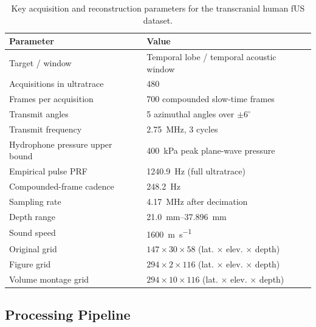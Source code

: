 \documentclass[11pt]{article}
\begin{document}
\begin{table}[t]
\centering
\caption{Key acquisition and reconstruction parameters for the
  transcranial human fUS dataset.}
\label{tab:invivo_params}
\small
\begin{tabular}{@{}ll@{}}
\toprule
Parameter & Value \\
\midrule
Target / window & Temporal lobe / temporal acoustic window \\
Acquisitions in ultratrace & 480 \\
Frames per acquisition & 700 compounded slow-time frames \\
Transmit angles & 5 azimuthal angles over $\pm 6^\circ$ \\
Transmit frequency & \SI{2.75}{\mega\hertz}, 3 cycles \\
Hydrophone pressure upper bound & \SI{400}{\kilo\pascal} peak plane-wave pressure \\
Empirical pulse PRF & \SI{1240.9}{\hertz} (full ultratrace) \\
Compounded-frame cadence & \SI{248.2}{\hertz} \\
Sampling rate & \SI{4.17}{\mega\hertz} after decimation \\
Depth range & \SIrange{21.0}{37.896}{\milli\meter} \\
Sound speed & \SI{1600}{\meter\per\second} \\
Original grid & $147 \times 30 \times 58$ (lat. $\times$ elev. $\times$ depth) \\
Figure grid & $294 \times 2 \times 116$ (lat. $\times$ elev. $\times$ depth) \\
Volume montage grid & $294 \times 10 \times 116$ (lat. $\times$ elev. $\times$ depth) \\
\bottomrule
\end{tabular}
\end{table}

\subsection{Processing Pipeline}
\end{document}
